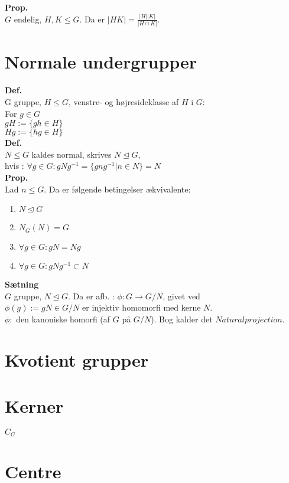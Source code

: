 \documentclass{article}
\begin{document}
\textbf{Prop.}\\
$G$ endelig, $H, K \leq G$. Da er $|HK| = \frac{|H||K|}{|H \cap K|}$.

\section*{Normale undergrupper}
\textbf{Def.}\\
G gruppe, $H \leq G$, venstre- og højresideklasse af $H$ i $G$:\\
For $g \in G$\\
$gH := \{ gh \in H\}$\\
$Hg := \{ hg \in H\}$\\
\textbf{Def.}\\
$N \leq G$ kaldes normal, skrives $N \trianglelefteq G$,\\
hvis : $\forall{g \in G} : gNg^{-1} = \{ gng^{-1} | n \in N\} = N$\\
\textbf{Prop.}\\
Lad $n \leq G$. Da er følgende betingelser ækvivalente:
\begin{enumerate}
  \item $N \trianglelefteq G$
  \item $N_G(N) = G$
  \item $\forall{g \in G} : gN = Ng$
  \item $\forall{g \in G} : gNg^{-1} \subset N$
\end{enumerate}

\textbf{Sætning}\\
$G$ gruppe, $N \trianglelefteq G$. Da er afb. :
$\phi : G \to G/N$, givet ved\\
$\phi(g) := gN \in G/N$ er injektiv homomorfi med kerne $N$.\\
$\phi :$ den kanoniske homorfi (af $G$ på $G/N$).
Bog kalder det $Natural projection$.\\

\section*{Kvotient grupper}

\section*{Kerner}
$C_G$
\section*{Centre}
\end{document}

